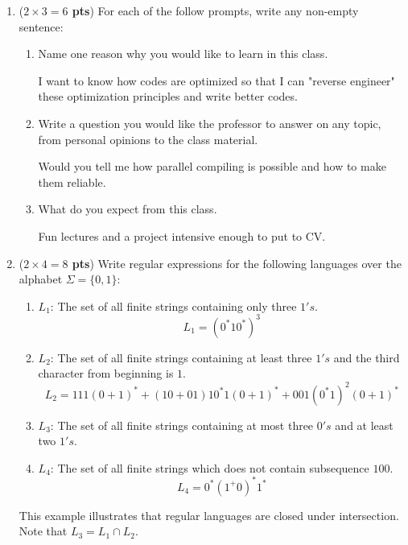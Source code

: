 \documentclass[10pt]{article}
\newcommand {\pts}[1]{({\bf #1 pts})}
\begin{document}
\begin{enumerate}
  \item \pts{$2\times 3=6$} For each of the follow prompts, write any non-empty sentence:
  \begin{enumerate}
		   \item Name one reason why you would like to learn in this class.

			I want to know how codes are optimized so that I can "reverse engineer" these optimization principles and write better codes.

		   \item Write a question you would like the professor to answer on any topic, from personal opinions to the class material.

		   Would you tell me how parallel compiling is possible and how to make them reliable.

		   \item What do you expect from this class.

		   Fun lectures and a project intensive enough to put to CV.

  \end{enumerate}
  \item \pts{$2\times 4=8$} Write regular expressions for the following languages over the alphabet $\Sigma=\{0,1\}$:
 \begin{enumerate}
		   \item $L_1$: The set of all finite strings containing only three $1's$.
			\[
			L_1 = (0^*10^*)^3
			\]
		   \item $L_2$: The set of all finite strings containing at least three $1's$ and the third character from beginning is $1$.
			\[
		   L_2 = 111(0+1)^* + (10+01)10^*1(0+1)^* + 001(0^*1)^2(0+1)^*
			\]
		   \item $L_3$: The set of all finite strings containing at most three $0's$ and at least two $1's$.
			\[
			\]
		   \item $L_4$: The set of all finite strings which does not contain subsequence $100$.
			\[
			L_4 = 0^*(1^+0)^*1^*
			\]
   \end{enumerate}
   This example illustrates that regular languages are closed under intersection. Note that
   $L_3=L_1\cap L_2$.


\end{enumerate}
\end{document}
